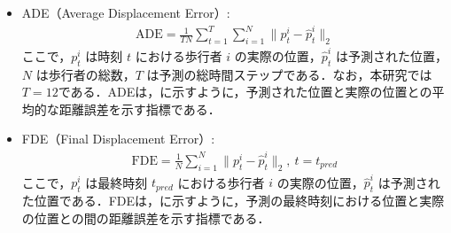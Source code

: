 \begin{itemize}
  \item ADE（Average Displacement Error）\cite{pellegrini2009you-eth}:
    \begin{align}
      \text{ADE} = \frac{1}{TN} \sum_{t=1}^{T} \sum_{i=1}^{N} \| p^i_t - \hat{p}^i_t \|_2
    \end{align}
    ここで，$p^i_t$ は時刻 $t$ における歩行者 $i$ の実際の位置，$\hat{p}^i_t$ は予測された位置，$N$ は歩行者の総数，$T$ は予測の総時間ステップである．なお，本研究では$T = 12$である．ADEは，に示すように，予測された位置と実際の位置との平均的な距離誤差を示す指標である．
    \\
    \item FDE（Final Displacement Error）\cite{s-lstm}:
    \begin{align}
      \text{FDE} = \frac{1}{N} \sum_{i=1}^{N} \| p^i_t - \hat{p}^i_t \|_2 , \ t = t_{pred}
    \end{align}
    ここで，$p^i_t$ は最終時刻 $t_{pred}$ における歩行者 $i$ の実際の位置，$\hat{p}^i_t$ は予測された位置である．FDEは，に示すように，予測の最終時刻における位置と実際の位置との間の距離誤差を示す指標である．
\end{itemize}

